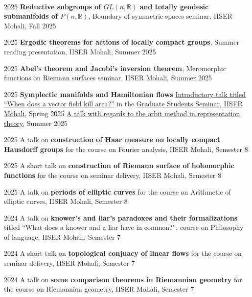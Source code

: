 \documentclass{LoLaTeXcv}
\begin{document}
\

\begin{lltxItemize}
	\item[2025] \textbf{Reductive subgroups of $GL(n,\mathbb{R})$ and totally geodesic submanifolds of $P(n,\mathbb{R})$}, Boundary of symmetric spaces seminar, IISER Mohali, Fall 2025
	\item[2025] \textbf{Ergodic theorems for actions of locally compact groups}, Summer reading presentation, IISER Mohali, Summer 2025
	\item[2025] \textbf{Abel's theorem and Jacobi's inversion theorem}, Meromorphic functions on Riemann surfaces seminar, IISER Mohali, Summer 2025
	\item[2025] \textbf{Symplectic manifolds and Hamiltonian flows}
		\subitem \href{https://ggl.link/hamiltonian}{Introductory talk titled ``When
		does a vector field kill area?''} in the \href{https://web.iisermohali.ac.in/dept/math/seminars/gsg/}{Graduate Students Seminar, IISER Mohali}, Spring 2025
		\subitem \href{https://dub.sh/qofhamil}{A talk with regards to the orbit method in representation theory}, Summer 2025
	\item[2025] A talk on \textbf{construction of Haar measure on locally compact Hausdorff groups} for the course on Fourier analysis, IISER Mohali, Semester 8
	\item[2025] A short talk on \textbf{construction of Riemann surface of holomorphic functions} for the course on seminar delivery, IISER Mohali, Semester 8
	\item[2025] A talk on \textbf{periods of elliptic curves} for the course on Arithmetic of elliptic curves, IISER Mohali, Semester 8
	\item[2024] A talk on \textbf{knower's and liar's paradoxes and their formalizations} titled ``What does a knower and a liar have in common?'', course on Philosophy of language, IISER Mohali, Semester 7
	\item[2024] A short talk on \textbf{topological conjuacy of linear flows} for the course on seminar delivery, IISER Mohali, Semester 7
	\item[2024] A talk on \textbf{some comparison theorems in Riemannian geometry} for the course on Riemannian geometry, IISER Mohali, Semester 7
\end{lltxItemize}


\end{document}
